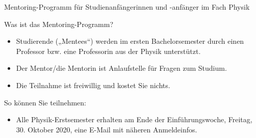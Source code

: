 \documentclass[german]{beamer}
\begin{document}
\begin{frame}{Mentoring-Programm für Studienanf\"angerinnen und -anf\"anger im Fach Physik}

Was ist das Mentoring-Programm?
\begin{itemize}
\item Studierende („Mentees“) werden im ersten Bachelorsemester durch einen Professor bzw. eine Professorin aus der Physik unterst\"utzt.
\item Der Mentor/die Mentorin ist Anlaufstelle für Fragen zum Studium.
\item Die Teilnahme ist freiwillig und kostet Sie nichts.
\end{itemize}

So k\"onnen Sie teilnehmen:
\begin{itemize}
\item Alle Physik-Erstsemester erhalten am Ende der Einf\"uhrungswoche,
Freitag, 30. Oktober 2020, eine E-Mail mit n\"aheren Anmeldeinfos.
\end{itemize}

\end{frame}


\begin{frame}

\end{frame}
\end{document}
